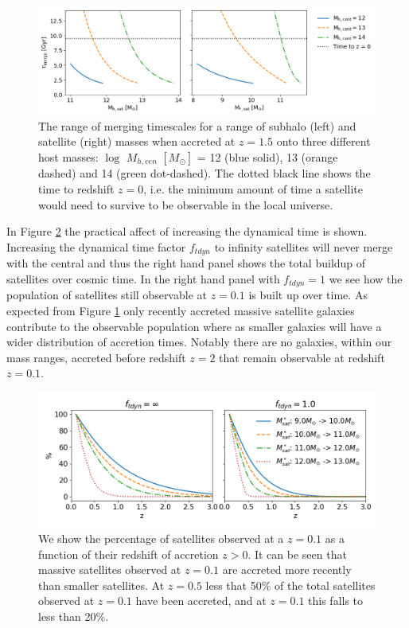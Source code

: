 \begin{figure}[h]
	\centering
	\includegraphics[width = \linewidth]{Figures/Chapter3/Tdyn_M.png}
	\caption{The range of merging timescales for a range of subhalo (left) and satellite (right) masses when accreted at $z = 1.5$ onto three different host masses: $\log$ $M_{h, cen}$ $[M_{\odot}]$ = 12 (blue solid), 13 (orange dashed) and 14 (green dot-dashed). The dotted black line shows the time to redshift $z = 0$, i.e. the minimum amount of time a satellite would need to survive to be observable in the local universe.}
	\label{fig:Tdyn_M}
\end{figure}

In Figure \ref{fig:AccretionTime} the practical affect of increasing the dynamical time is shown. Increasing the dynamical time factor $f_{tdyn}$ to infinity satellites will never merge with the central and thus the right hand panel shows the total buildup of satellites over cosmic time. In the right hand panel with $f_{tdyn} = 1$ we see how the population of satellites still observable at $z=0.1$ is built up over time. As expected from Figure \ref{fig:Tdyn_M} only recently accreted massive satellite galaxies contribute to the observable population where as smaller galaxies will have a wider distribution of accretion times. Notably there are no galaxies, within our mass ranges, accreted before redshift $z=2$ that remain observable at redshift $z=0.1$.

\begin{figure}[h]
	\centering
	\includegraphics[width = \linewidth]{Figures/Chapter3/AccretedSatellitePercentage.png}
	\caption{We show the percentage of satellites observed at a $z = 0.1$ as a function of their redshift of accretion $z > 0$. It can be seen that massive satellites observed at $z = 0.1$ are accreted more recently than smaller satellites. At $z = 0.5$ less that 50\% of the total satellites observed at $z = 0.1$ have been accreted, and at $z = 0.1$ this falls to less than 20\%. }
	\label{fig:AccretionTime}
\end{figure}

